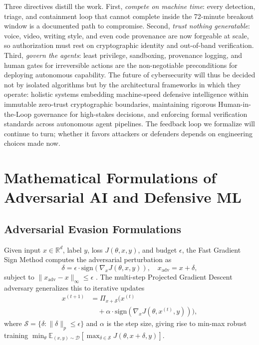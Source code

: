 \documentclass[conference,10pt,twocolumn,a4paper]{IEEEtran}
\begin{document}
Three directives distill the work. First, \emph{compete on machine time}: every detection, triage, and containment loop that cannot complete inside the 72-minute breakout window is a documented path to compromise. Second, \emph{trust nothing generatable}: voice, video, writing style, and even code provenance are now forgeable at scale, so authorization must rest on cryptographic identity and out-of-band verification. Third, \emph{govern the agents}: least privilege, sandboxing, provenance logging, and human gates for irreversible actions are the non-negotiable preconditions for deploying autonomous capability. The future of cybersecurity will thus be decided not by isolated algorithms but by the architectural frameworks in which they operate: holistic systems embedding machine-speed defensive intelligence within immutable zero-trust cryptographic boundaries, maintaining rigorous Human-in-the-Loop governance for high-stakes decisions, and enforcing formal verification standards across autonomous agent pipelines. The feedback loop we formalize will continue to turn; whether it favors attackers or defenders depends on engineering choices made now.

\appendices
\section{Mathematical Formulations of Adversarial AI and Defensive ML}
\label{app:a}
\subsection{Adversarial Evasion Formulations}
Given input $x \in \mathbb{R}^d$, label $y$, loss $J(\theta, x, y)$, and budget $\epsilon$, the Fast Gradient Sign Method computes the adversarial perturbation as
\begin{equation}
\delta = \epsilon \cdot \mathrm{sign}\left(\nabla_x J(\theta, x, y)\right), \quad x_{\mathrm{adv}} = x + \delta,
\end{equation}
subject to $\|x_{\mathrm{adv}} - x\|_\infty \le \epsilon$ \cite{goodfellow2015explaining}. The multi-step Projected Gradient Descent adversary generalizes this to iterative updates
\begin{equation}
\begin{split}
x^{(t+1)} &= \Pi_{x + \mathcal{S}} \Big( x^{(t)} \\
&\quad + \alpha \cdot \mathrm{sign}\left(\nabla_x J(\theta, x^{(t)}, y)\right) \Big),
\end{split}
\end{equation}
where $\mathcal{S} = \{ \delta : \|\delta\|_p \le \epsilon \}$ and $\alpha$ is the step size, giving rise to min-max robust training $\min_\theta \mathbb{E}_{(x,y)\sim\mathcal{D}}[\max_{\delta \in \mathcal{S}} J(\theta, x+\delta, y)]$.
\end{document}
